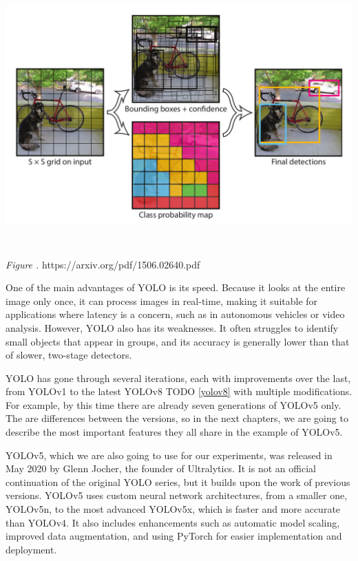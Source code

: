\documentclass[14pt,a4paper]{extarticle}
\newcounter{e}
\newcounter{pic}
\newcommand{\pic}[1]{\refstepcounter{pic} \vspace{-0.3cm}\textit{Figure \arabic{pic}\label{#1}.}}
\newcounter{tabl}
\numberwithin{equation}{section}
\numberwithin{figure}{section}
\begin{document}
\begin{center}
    \includegraphics[height=10cm]{images/yolo-grid.png}
\end{center}
\begin{center}
    \pic{yolo-grid} https://arxiv.org/pdf/1506.02640.pdf
\end{center}


One of the main advantages of YOLO is its speed. Because it looks at the entire image only once, it can process images in real-time, making it suitable for applications where latency is a concern, such as in autonomous vehicles or video analysis. However, YOLO also has its weaknesses. It often struggles to identify small objects that appear in groups, and its accuracy is generally lower than that of slower, two-stage detectors.

YOLO has gone through several iterations, each with improvements over the last, from YOLOv1 to the latest YOLOv8 TODO \ref{yolov8} with multiple modifications. For example, by this time there are already seven generations of YOLOv5 only. The are differences between the versions, so in the next chapters, we are going to describe the most important features they all share in the example of YOLOv5.

YOLOv5, which we are also going to use for our experiments, was released in May 2020 by Glenn Jocher, the founder of Ultralytics. It is not an official continuation of the original YOLO series, but it builds upon the work of previous versions. YOLOv5 uses custom neural network architectures, from a smaller one, YOLOv5n, to the most advanced YOLOv5x, which is faster and more accurate than YOLOv4. It also includes enhancements such as automatic model scaling, improved data augmentation, and using PyTorch for easier implementation and deployment.
\end{document}
